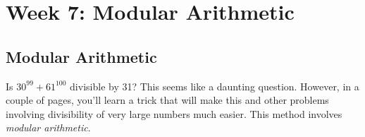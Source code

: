 \documentclass[11pt,dvipsnames]{book}
\numberwithin{equation}{section} %
\numberwithin{figure}{section} %
\numberwithin{table}{section} %
\begin{document}




\pagestyle{empty} %

 \tableofcontents %

\cleardoublepage %

\pagestyle{fancy} %




\part{Week 7: Modular Arithmetic}







\setcounter{chapter}{11}

\setcounter{page}{0}


\chapter{Modular Arithmetic}


%





\indent Is $30^{99}+61^{100}$  divisible by 31? This seems like a daunting question. However, in a couple of pages, you'll learn a trick that will make this and other problems involving divisibility of very large numbers much easier. This method involves {\it modular arithmetic}.  
\end{document}
